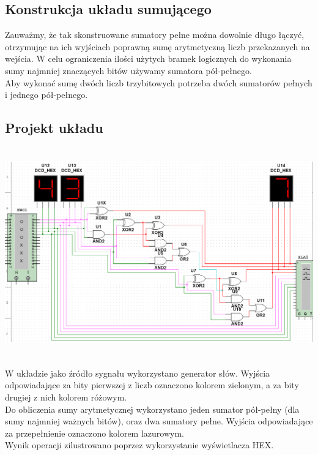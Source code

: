 \documentclass{article}
\begin{document}
        \subsection{Konstrukcja układu sumującego}
            Zauważmy, że tak skonstruowane sumatory pełne można dowolnie długo łączyć, otrzymując na ich wyjściach poprawną sumę arytmetyczną liczb przekazanych na wejścia. W celu ograniczenia ilości użytych bramek logicznych do wykonania sumy najmniej znaczących bitów używamy sumatora pół-pełnego.\\ 
            Aby wykonać sumę dwóch liczb trzybitowych potrzeba dwóch sumatorów pełnych i jednego pół-pełnego.

        \subsection{Projekt układu}
            \begin{center}
                \includegraphics[height=9cm]{reports/img/Z1A_1.png}\\
            \end{center}
            W układzie jako źródło sygnału wykorzystano generator słów. Wyjścia odpowiadające za bity pierwszej z liczb oznaczono kolorem zielonym, a za bity drugiej z nich kolorem różowym. \\
            Do obliczenia sumy arytmetycznej wykorzystano jeden sumator pół-pełny (dla sumy najmniej ważnych bitów), oraz dwa sumatory pełne. Wyjścia odpowiadające za przepełnienie oznaczono kolorem lazurowym. \\
            Wynik operacji zilustrowano poprzez wykorzystanie wyświetlacza HEX. 
        
\end{document}
